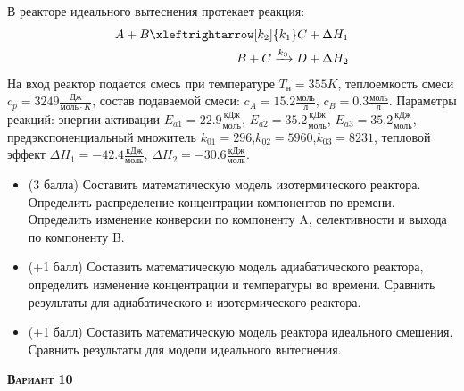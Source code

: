  В реакторе идеального вытеснения протекает реакция: \begin{equation*} \begin{aligned} A+B \xleftrightarrow[k_2]{k_1} C + \Delta H_1 \\ B + C \xrightarrow{k_3} D + \Delta H_2 \end{aligned} \end{equation*}                                На вход  реактор подается смесь при температуре $ T_н =  355 K$, теплоемкость смеси $c_p= 3249 \frac{Дж}{моль \cdot K}$, состав подаваемой смеси: $c_A=15.2 \frac{моль}{л}$, $c_B=0.3 \frac{моль}{л}$. Параметры реакций: энергии активации $E_{a1}=22.9 \frac{кДж}{моль}$, $E_{a2}=35.2  \frac{кДж}{моль}$, $E_{a3}=35.2  \frac{кДж}{моль}$, предэкспоненциальный множитель $k_{01}=       296$,$k_{02}=      5960$,$k_{03}=      8231$, тепловой эффект $\Delta H_1= -42.4  \frac{кДж}{моль}$, $\Delta H_2=-30.6 \frac{кДж}{моль}$.\begin{itemize} \item (3 балла) Составить математическую модель изотермического реактора. Определить распределение концентрации компонентов по времени. Определить изменение конверсии по компоненту A, селективности и выхода по компоненту B. \item (+1 балл) Составить математическую модель адиабатического реактора, определить изменение концентрации и температуры во времени. Сравнить результаты для адиабатического и изотермического реактора. \item (+1 балл) Составить математическую модель реактора идеального смешения. Сравнить результаты для модели идеального вытеснения. \end{itemize}

\textsc{\textbf{Вариант 10}}

